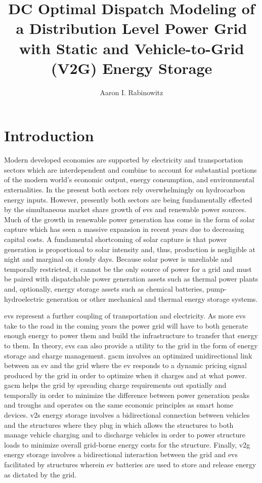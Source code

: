 \documentclass[12pt]{article}
\title{DC Optimal Dispatch Modeling of a Distribution Level Power Grid with Static and Vehicle-to-Grid (V2G) Energy Storage}
\author{Aaron I. Rabinowitz}
\date{}
\begin{document}
\maketitle

\section*{Introduction}

Modern developed economies are supported by electricity and transportation sectors which are interdependent and combine to account for substantial portions of the modern world's economic output, energy consumption, and environmental externalities. In the present both sectors rely overwhelmingly on hydrocarbon energy inputs. However, presently both sectors are being fundamentally effected by the simultaneous market share growth of \glspl{ev} and renewable power sources. Much of the growth in renewable power generation has come in the form of solar capture which has seen a massive expansion in recent years due to decreasing capital costs. A fundamental shortcoming of solar capture is that power generation is proportional to solar intensity and, thus, production is negligible at night and marginal on cloudy days. Because solar power is unreliable and temporally restricted, it cannot be the only source of power for a grid and must be paired with dispatchable power generation assets such as thermal power plants and, optionally, energy storage assets such as chemical batteries, pump-hydroelectric generation or other mechanical and thermal energy storage systems.

\glspl{ev} represent a further coupling of transportation and electricity. As more \glspl{ev} take to the road in the coming years the power grid will have to both generate enough energy to power them and build the infrastructure to transfer that energy to them. In theory, \glspl{ev} can also provide a utility to the grid in the form of energy storage and charge management. \gls{gacm} involves an optimized unidirectional link between an \gls{ev} and the grid where the \gls{ev} responds to a dynamic pricing signal produced by the grid in order to optimize when it charges and at what power. \gls{gacm} helps the grid by spreading charge requirements out spatially and temporally in order to minimize the difference between power generation peaks and troughs and operates on the same economic principles as smart home devices. \gls{v2s} energy storage involves a bidirectional connection between vehicles and the structures where they plug in which allows the structures to both manage vehicle charging and to discharge vehicles in order to power structure loads to minimize overall grid-borne energy costs for the structure. Finally, \gls{v2g} energy storage involves a bidirectional interaction between the grid and \glspl{ev} facilitated by structures wherein \gls{ev} batteries are used to store and release energy as dictated by the grid.
\end{document}
